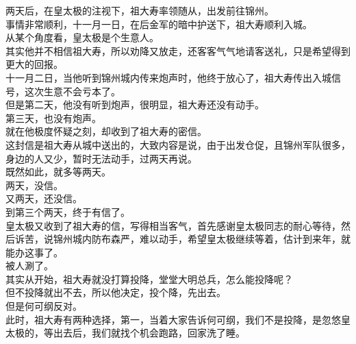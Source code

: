 \begin{multicols}{\theparacolNo}
两天后，在皇太极的注视下，祖大寿率领随从，出发前往锦州。\\

事情非常顺利，十一月一日，在后金军的暗中护送下，祖大寿顺利入城。\\

从某个角度看，皇太极是个生意人。\\

其实他并不相信祖大寿，所以劝降又放走，还客客气气地请客送礼，只是希望得到更大的回报。\\

十一月二日，当他听到锦州城内传来炮声时，他终于放心了，祖大寿传出入城信号，这次生意不会亏本了。\\

但是第二天，他没有听到炮声，很明显，祖大寿还没有动手。\\

第三天，也没有炮声。\\

就在他极度怀疑之刻，却收到了祖大寿的密信。\\

这封信是祖大寿从城中送出的，大致内容是说，由于出发仓促，且锦州军队很多，身边的人又少，暂时无法动手，过两天再说。\\

既然如此，就多等两天。\\

两天，没信。\\

又两天，还没信。\\

到第三个两天，终于有信了。\\

皇太极又收到了祖大寿的信，写得相当客气，首先感谢皇太极同志的耐心等待，然后诉苦，说锦州城内防布森严，难以动手，希望皇太极继续等着，估计到来年，就能办这事了。\\

被人涮了。\\

其实从开始，祖大寿就没打算投降，堂堂大明总兵，怎么能投降呢？\\

但不投降就出不去，所以他决定，投个降，先出去。\\

但是何可纲反对。\\

此时，祖大寿有两种选择，第一，当着大家告诉何可纲，我们不是投降，是忽悠皇太极的，等出去后，我们就找个机会跑路，回家洗了睡。\\


\end{multicols}
